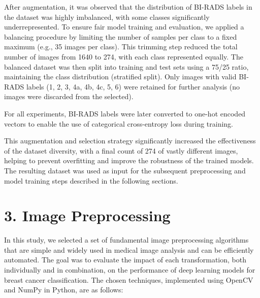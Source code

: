 \documentclass[12pt]{article}
\begin{document}
After augmentation, it was observed that the distribution of BI-RADS labels in the dataset was highly imbalanced, with some classes significantly underrepresented. To ensure fair model training and evaluation, we applied a balancing procedure by limiting the number of samples per class to a fixed maximum (e.g., 35 images per class). This trimming step reduced the total number of images from 1640 to 274, with each class represented equally. The balanced dataset was then split into training and test sets using a 75/25 ratio, maintaining the class distribution (stratified split). Only images with valid BI-RADS labels (1, 2, 3, 4a, 4b, 4c, 5, 6) were retained for further analysis (no images were discarded from the selected).

For all experiments, BI-RADS labels were later converted to one-hot encoded vectors to enable the use of categorical cross-entropy loss during training.

This augmentation and selection strategy significantly increased the effectiveness of the dataset diversity, with a final count of 274 of vastly different images, helping to prevent overfitting and improve the robustness of the trained models. The resulting dataset was used as input for the subsequent preprocessing and model training steps described in the following sections.

\section*{3. Image Preprocessing}

In this study, we selected a set of fundamental image preprocessing algorithms that are simple and widely used in medical image analysis and can be efficiently automated. The goal was to evaluate the impact of each transformation, both individually and in combination, on the performance of deep learning models for breast cancer classification. The chosen techniques, implemented using OpenCV~\cite{opencv_library} and NumPy in Python, are as follows:
\end{document}
